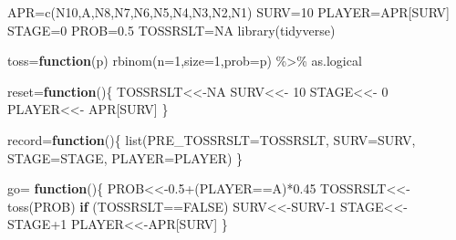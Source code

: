 \documentclass[
  12pt,
]{article}
\newenvironment{Shaded}{\begin{snugshade}}{\end{snugshade}}
\newcommand{\AttributeTok}[1]{\textcolor[rgb]{0.77,0.63,0.00}{#1}}
\newcommand{\ConstantTok}[1]{\textcolor[rgb]{0.00,0.00,0.00}{#1}}
\newcommand{\ControlFlowTok}[1]{\textcolor[rgb]{0.13,0.29,0.53}{\textbf{#1}}}
\newcommand{\DecValTok}[1]{\textcolor[rgb]{0.00,0.00,0.81}{#1}}
\newcommand{\FloatTok}[1]{\textcolor[rgb]{0.00,0.00,0.81}{#1}}
\newcommand{\FunctionTok}[1]{\textcolor[rgb]{0.00,0.00,0.00}{#1}}
\newcommand{\NormalTok}[1]{#1}
\newcommand{\OtherTok}[1]{\textcolor[rgb]{0.56,0.35,0.01}{#1}}
\newcommand{\SpecialCharTok}[1]{\textcolor[rgb]{0.00,0.00,0.00}{#1}}
\newcommand{\StringTok}[1]{\textcolor[rgb]{0.31,0.60,0.02}{#1}}
\begin{document}
\begin{Shaded}
\begin{Highlighting}[]
\NormalTok{APR}\OtherTok{=}\FunctionTok{c}\NormalTok{(}\StringTok{\textquotesingle{}N10\textquotesingle{}}\NormalTok{,}\StringTok{\textquotesingle{}A\textquotesingle{}}\NormalTok{,}\StringTok{\textquotesingle{}N8\textquotesingle{}}\NormalTok{,}\StringTok{\textquotesingle{}N7\textquotesingle{}}\NormalTok{,}\StringTok{\textquotesingle{}N6\textquotesingle{}}\NormalTok{,}\StringTok{\textquotesingle{}N5\textquotesingle{}}\NormalTok{,}\StringTok{\textquotesingle{}N4\textquotesingle{}}\NormalTok{,}\StringTok{\textquotesingle{}N3\textquotesingle{}}\NormalTok{,}\StringTok{\textquotesingle{}N2\textquotesingle{}}\NormalTok{,}\StringTok{\textquotesingle{}N1\textquotesingle{}}\NormalTok{)}
\NormalTok{SURV}\OtherTok{=}\DecValTok{10}
\NormalTok{PLAYER}\OtherTok{=}\NormalTok{APR[SURV]}
\NormalTok{STAGE}\OtherTok{=}\DecValTok{0}
\NormalTok{PROB}\OtherTok{=}\FloatTok{0.5}
\NormalTok{TOSSRSLT}\OtherTok{=}\ConstantTok{NA}
\FunctionTok{library}\NormalTok{(tidyverse)}

\NormalTok{toss}\OtherTok{=}\ControlFlowTok{function}\NormalTok{(p) }\FunctionTok{rbinom}\NormalTok{(}\AttributeTok{n=}\DecValTok{1}\NormalTok{,}\AttributeTok{size=}\DecValTok{1}\NormalTok{,}\AttributeTok{prob=}\NormalTok{p) }\SpecialCharTok{\%\textgreater{}\%}\NormalTok{ as.logical}

\NormalTok{reset}\OtherTok{=}\ControlFlowTok{function}\NormalTok{()\{}
\NormalTok{  TOSSRSLT}\OtherTok{\textless{}\textless{}{-}}\ConstantTok{NA}
\NormalTok{  SURV}\OtherTok{\textless{}\textless{}{-}} \DecValTok{10}
\NormalTok{  STAGE}\OtherTok{\textless{}\textless{}{-}} \DecValTok{0}
\NormalTok{  PLAYER}\OtherTok{\textless{}\textless{}{-}}\NormalTok{ APR[SURV]}
\NormalTok{\}}

\NormalTok{record}\OtherTok{=}\ControlFlowTok{function}\NormalTok{()\{}
  \FunctionTok{list}\NormalTok{(}\AttributeTok{PRE\_TOSSRSLT=}\NormalTok{TOSSRSLT, }\AttributeTok{SURV=}\NormalTok{SURV, }\AttributeTok{STAGE=}\NormalTok{STAGE, }\AttributeTok{PLAYER=}\NormalTok{PLAYER)}
\NormalTok{\}}

\NormalTok{go}\OtherTok{=} \ControlFlowTok{function}\NormalTok{()\{}
\NormalTok{  PROB}\OtherTok{\textless{}\textless{}{-}}\FloatTok{0.5}\SpecialCharTok{+}\NormalTok{(PLAYER}\SpecialCharTok{==}\StringTok{\textquotesingle{}A\textquotesingle{}}\NormalTok{)}\SpecialCharTok{*}\FloatTok{0.45}
\NormalTok{  TOSSRSLT}\OtherTok{\textless{}\textless{}{-}}\FunctionTok{toss}\NormalTok{(PROB)}
  \ControlFlowTok{if}\NormalTok{ (TOSSRSLT}\SpecialCharTok{==}\ConstantTok{FALSE}\NormalTok{) SURV}\OtherTok{\textless{}\textless{}{-}}\NormalTok{SURV}\DecValTok{{-}1}
\NormalTok{  STAGE}\OtherTok{\textless{}\textless{}{-}}\NormalTok{STAGE}\SpecialCharTok{+}\DecValTok{1}
\NormalTok{  PLAYER}\OtherTok{\textless{}\textless{}{-}}\NormalTok{APR[SURV]}
\NormalTok{\}}


\end{Highlighting}
\end{Shaded}
\end{document}

